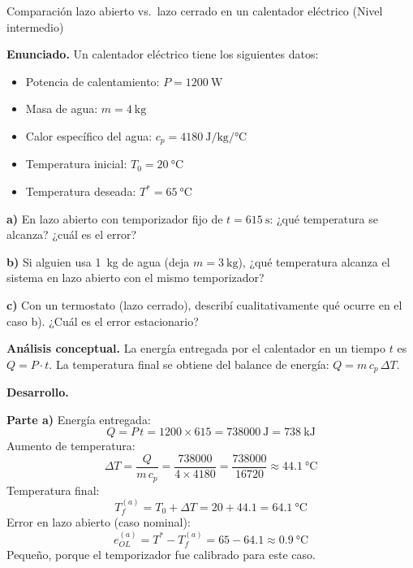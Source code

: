 \begin{ejercicioresuelto}{Comparación lazo abierto vs.\ lazo cerrado en un calentador eléctrico (Nivel intermedio)}

\textbf{Enunciado.} Un calentador eléctrico tiene los siguientes datos:
\begin{itemize}
  \item Potencia de calentamiento: $P = \SI{1200}{\watt}$
  \item Masa de agua: $m = \SI{4}{\kilogram}$
  \item Calor específico del agua: $c_p = \SI{4180}{\joule\per\kilogram\per\celsius}$
  \item Temperatura inicial: $T_0 = \SI{20}{\celsius}$
  \item Temperatura deseada: $T^* = \SI{65}{\celsius}$
\end{itemize}

\textbf{a)} En lazo abierto con temporizador fijo de $t = \SI{615}{\second}$:
¿qué temperatura se alcanza? ¿cuál es el error?

\textbf{b)} Si alguien usa \SI{1}{\kilogram} de agua (deja $m = \SI{3}{\kilogram}$),
¿qué temperatura alcanza el sistema en lazo abierto con el mismo temporizador?

\textbf{c)} Con un termostato (lazo cerrado), describí cualitativamente qué ocurre
en el caso b). ¿Cuál es el error estacionario?

\textbf{Análisis conceptual.} La energía entregada por el calentador en un
tiempo $t$ es $Q = P \cdot t$. La temperatura final se obtiene del balance
de energía: $Q = m\,c_p\,\Delta T$.

\textbf{Desarrollo.}

\textbf{Parte a)} Energía entregada:
\begin{equation*}
  Q = P\,t = 1200 \times 615 = \SI{738000}{\joule} = \SI{738}{\kilo\joule}
\end{equation*}
Aumento de temperatura:
\begin{equation*}
  \Delta T = \frac{Q}{m\,c_p} = \frac{738000}{4 \times 4180} = \frac{738000}{16720}
  \approx \SI{44.1}{\celsius}
\end{equation*}
Temperatura final:
\begin{equation*}
  T_f^{(a)} = T_0 + \Delta T = 20 + 44.1 = \SI{64.1}{\celsius}
\end{equation*}
Error en lazo abierto (caso nominal):
\begin{equation*}
  e_{OL}^{(a)} = T^* - T_f^{(a)} = 65 - 64.1 \approx \SI{0.9}{\celsius}
\end{equation*}
Pequeño, porque el temporizador fue calibrado para este caso.


\end{ejercicioresuelto}
